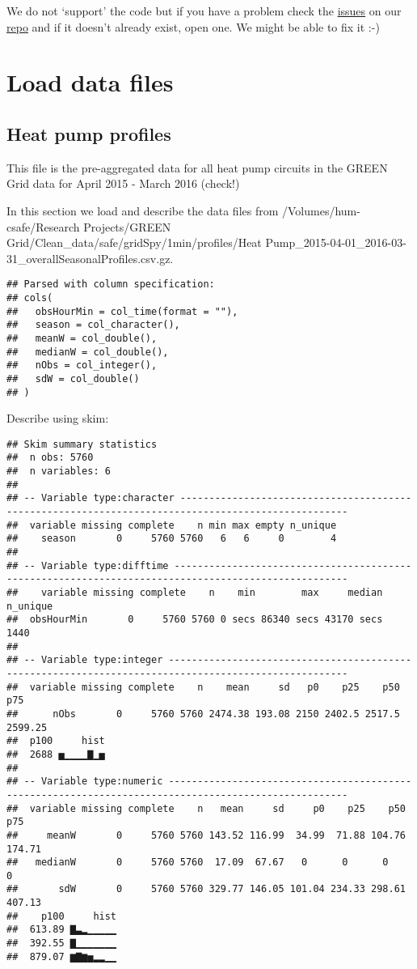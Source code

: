 \documentclass[]{article}
\begin{document}
We do not `support' the code but if you have a problem check the
\href{https://git.soton.ac.uk/ba1e12/nzGREENGrid/issues}{issues} on our
\href{https://git.soton.ac.uk/ba1e12/nzGREENGrid}{repo} and if it
doesn't already exist, open one. We might be able to fix it :-)

\section{Load data files}\label{load-data-files}

\subsection{Heat pump profiles}\label{heat-pump-profiles}

This file is the pre-aggregated data for all heat pump circuits in the
GREEN Grid data for April 2015 - March 2016 (check!)

In this section we load and describe the data files from
/Volumes/hum-csafe/Research Projects/GREEN
Grid/Clean\_data/safe/gridSpy/1min/profiles/Heat
Pump\_2015-04-01\_2016-03-31\_overallSeasonalProfiles.csv.gz.

\begin{verbatim}
## Parsed with column specification:
## cols(
##   obsHourMin = col_time(format = ""),
##   season = col_character(),
##   meanW = col_double(),
##   medianW = col_double(),
##   nObs = col_integer(),
##   sdW = col_double()
## )
\end{verbatim}

Describe using skim:

\begin{verbatim}
## Skim summary statistics
##  n obs: 5760 
##  n variables: 6 
## 
## -- Variable type:character ---------------------------------------------------------------------------------------------------
##  variable missing complete    n min max empty n_unique
##    season       0     5760 5760   6   6     0        4
## 
## -- Variable type:difftime ----------------------------------------------------------------------------------------------------
##    variable missing complete    n    min        max     median n_unique
##  obsHourMin       0     5760 5760 0 secs 86340 secs 43170 secs     1440
## 
## -- Variable type:integer -----------------------------------------------------------------------------------------------------
##  variable missing complete    n    mean     sd   p0    p25    p50     p75
##      nObs       0     5760 5760 2474.38 193.08 2150 2402.5 2517.5 2599.25
##  p100     hist
##  2688 ▅▁▁▁▁▇▁▅
## 
## -- Variable type:numeric -----------------------------------------------------------------------------------------------------
##  variable missing complete    n   mean     sd     p0    p25    p50    p75
##     meanW       0     5760 5760 143.52 116.99  34.99  71.88 104.76 174.71
##   medianW       0     5760 5760  17.09  67.67   0      0      0      0   
##       sdW       0     5760 5760 329.77 146.05 101.04 234.33 298.61 407.13
##    p100     hist
##  613.89 ▇▃▂▁▁▁▁▁
##  392.55 ▇▁▁▁▁▁▁▁
##  879.07 ▆▇▆▅▂▂▁▁
\end{verbatim}
\end{document}
